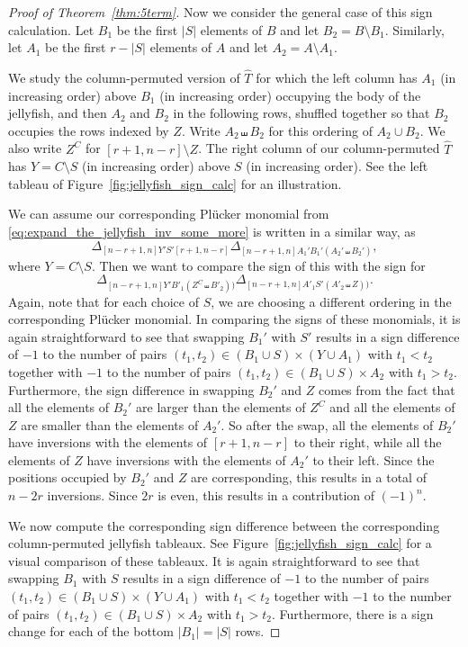 \documentclass[10pt]{amsart}
\theoremstyle{definition}
\theoremstyle{plain}
\theoremstyle{plain}
\theoremstyle{definition}
\theoremstyle{remark}
\theoremstyle{plain}
\theoremstyle{plain}
\theoremstyle{plain}
\numberwithin{equation}{section}
\begin{document}
\begin{proof}[Proof of Theorem~\ref{thm:5term}]
Now we consider the general case of this sign calculation. 
Let $B_1$ be the first $|S|$ elements of $B$ and let $B_2 = B \setminus B_1$. Similarly, let $A_1$ be the first $r - |S|$ elements of $A$ and let $A_2 = A \setminus A_1$.

We study the column-permuted version of $\widehat{T}$ for which the left column has $A_1$ (in increasing order) above $B_1$ (in increasing order) occupying the body of the jellyfish, and then $A_2$ and $B_2$ in the following rows, shuffled together so that $B_2$ occupies the rows indexed by $Z$. Write $A_2 \shuffle B_2$ for this ordering of $A_2 \cup B_2$. We also write $Z^C$ for $[r+1,n-r] \setminus Z$. The right column of our column-permuted $\widehat{T}$ has $Y = C \setminus S$ (in increasing order) above $S$ (in increasing order). See the left tableau of Figure~\ref{fig:jellyfish_sign_calc} for an illustration.

We can assume our corresponding Pl\"ucker monomial from \eqref{eq:expand_the_jellyfish_inv_some_more} is written in a similar way, as \[
\Delta_{[n-r+1,n]  Y'S' [r+1,n-r]} \Delta_{[n-r+1,n]  A_1'B_1' (A_2' \shuffle B_2')},
\]
where $Y = C \setminus S$. Then we want to compare the sign of this with the sign for
\[
\Delta_{[n-r+1,n]Y'B'_1(Z^C \shuffle B'_2))} \Delta_{[n-r+1,n]A'_1S'(A'_2 \shuffle Z))}.
\]
Again, note that for each choice of $S$, we are choosing a different ordering in the corresponding Pl\"ucker monomial. 
In comparing the signs of these monomials, it is again straightforward to see that swapping $B_1'$ with $S'$ results in a sign difference of $-1$ to the number of pairs $(t_1, t_2) \in (B_1 \cup S) \times (Y \cup A_1)$ with $t_1 < t_2$ together with $-1$ to the number of pairs $(t_1, t_2) \in (B_1 \cup S) \times A_2$ with $t_1 > t_2$. 
Furthermore, the sign difference in swapping $B_2'$ and $Z$ comes from the fact that all the elements of $B_2'$ are larger than the elements of $Z^C$ and all the elements of $Z$ are smaller than the elements of $A_2'$. So after the swap, all the elements of $B_2'$ have inversions with  the elements of $[r+1,n-r]$ to their right, while all the elements of $Z$ have inversions with the elements of $A_2'$ to their left. Since the positions occupied by $B_2'$ and $Z$ are corresponding, this results in a total of $n-2r$ inversions. Since $2r$ is even, this results in a contribution of $(-1)^n$.

We now compute the corresponding sign difference between the corresponding column-permuted jellyfish tableaux. See Figure~\ref{fig:jellyfish_sign_calc} for a visual comparison of these tableaux. It is again straightforward to see that swapping $B_1$ with $S$ results in a sign difference of $-1$ to the number of pairs $(t_1, t_2) \in (B_1 \cup S) \times (Y \cup A_1)$ with $t_1 < t_2$ together with $-1$ to the number of pairs $(t_1, t_2) \in (B_1 \cup S) \times A_2$ with $t_1 > t_2$. Furthermore, there is a sign change for each of the bottom $|B_1| = |S|$ rows.


\end{proof}
\end{document}
